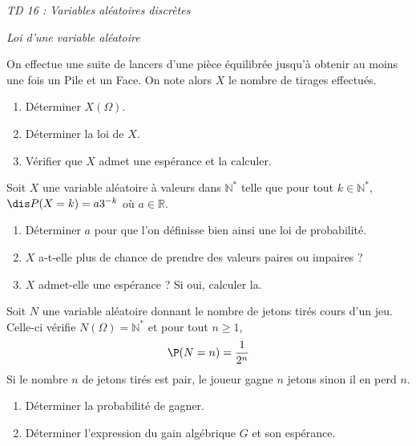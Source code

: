 \documentclass[a4paper,10pt]{report}
\begin{document}
\everymath{\displaystyle}

\begin{center}
\textit{{ {\huge TD 16 : Variables aléatoires discrètes}}}
\end{center}


\medskip

\begin{center}
\textit{{ {\large Loi d'une variable aléatoire}}}
\end{center}

\medskip

\begin{Exa} On effectue une suite de lancers d'une pièce équilibrée jusqu'à obtenir au moins une fois un Pile et un Face. On note alors $X$ le nombre de tirages effectués.

\begin{enumerate}
\item Déterminer $X(\Omega)$.
\item Déterminer la loi de $X$. 
\item Vérifier que $X$ admet une espérance et la calculer.
\end{enumerate}
\end{Exa}

\begin{Exa}
 Soit $X$ une variable aléatoire à valeurs dans $\mathbb{N}^*$ telle que pour tout $k \in \mathbb{N}^*$, $\dis P(X=k)=a3^{-k}$ où $a \in \mathbb{R}$.
\begin{enumerate}
\item Déterminer $a$ pour que l'on définisse bien ainsi une loi de probabilité.
\item $X$ a-t-elle plus de chance de prendre des valeurs paires ou impaires ?
\item $X$ admet-elle une espérance ? Si oui, calculer la.
\end{enumerate}
\end{Exa}



\begin{Exa} Soit $N$ une variable aléatoire donnant le nombre de jetons tirés cours d'un jeu. Celle-ci vérifie $N(\Omega)= \mathbb{N}^*$ et pour tout $n \geq 1$,
$$ \P(N=n) = \dfrac{1}{2^n}$$
Si le nombre $n$ de jetons tirés est pair, le joueur gagne $n$ jetons sinon il en perd $n$.
\begin{enumerate}
\item Déterminer la probabilité de gagner.
\item Déterminer l'expression du gain algébrique $G$ et son espérance.
\end{enumerate}
\end{Exa}
\end{document}
